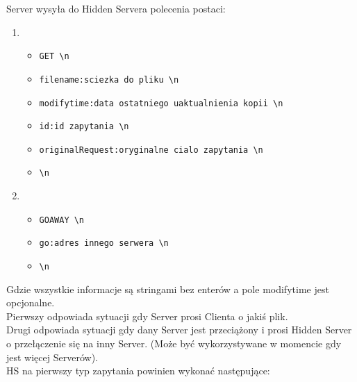 \documentclass[a4paper,notitlepage]{article}
\begin{document}
Server wysyła do Hidden Servera polecenia postaci:
\begin{enumerate}
    \item
\begin{itemize}
    \item \texttt{GET \textbackslash n}
    \item \texttt{filename:sciezka do pliku \textbackslash n}
    \item \texttt{modifytime:data ostatniego uaktualnienia kopii \textbackslash n}
    \item \texttt{id:id zapytania \textbackslash n}
    \item \texttt{originalRequest:oryginalne cialo zapytania \textbackslash n}
    \item \texttt{\textbackslash n}
\end{itemize}
    \item
\begin{itemize}    
    \item \texttt{GOAWAY \textbackslash n}
    \item \texttt{go:adres innego serwera \textbackslash n}
    \item \texttt{\textbackslash n}
\end{itemize}
\end{enumerate}
Gdzie wszystkie informacje są stringami bez enterów a pole modifytime jest opcjonalne. \\
Pierwszy odpowiada sytuacji gdy Server prosi Clienta o jakiś plik.\\ 
Drugi odpowiada sytuacji gdy dany Server jest przeciążony i prosi Hidden Server o przełączenie się na inny Server. (Może być wykorzystywane w momencie gdy jest więcej Serverów).\\
HS na pierwszy typ zapytania powinien wykonać następujące:
\end{document}
